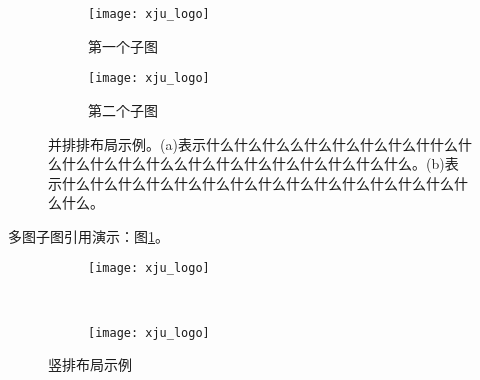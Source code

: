 \begin{figure}[!htb]
	\centering
	\begin{subfigure}[t]{0.24\linewidth}
		\captionsetup{justification=centering} %
		\begin{minipage}[b]{1\linewidth}
			\texttt{[image: xju\_logo]}
			\caption{第一个子图}
			\label{xju_logo1:subfig1}
		\end{minipage}
	\end{subfigure}
	\begin{subfigure}[t]{0.24\linewidth}
		\captionsetup{justification=centering} %
		\begin{minipage}[b]{1\linewidth}
			\texttt{[image: xju\_logo]}
			\caption{第二个子图}
			\label{xju_logo1:subfig2}
		\end{minipage}
	\end{subfigure}
	\caption{并排排布局示例。(a)表示什么什么什么么什么什么什么什么什什么什么什么什么什么什么么什么什么什么什么什么什么什么什么。(b)表示什么什么什么什么什么什么什么什么什么什么什么什么什么什么什么什么。}
	\label{xju_logo1}
\end{figure}

多图子图引用演示：图\ref{xju_logo1:subfig1}。

\begin{figure}[!htb]
	\centering
	\begin{subfigure}[t]{0.15\linewidth}
		\captionsetup{justification=centering}
		\begin{minipage}[b]{1\linewidth}
			\texttt{[image: xju\_logo]}
			\caption{}
		\end{minipage}
	\end{subfigure}\\
	\begin{subfigure}[t]{0.15\linewidth}
		\captionsetup{justification=centering}
		\begin{minipage}[b]{1\linewidth}
			\texttt{[image: xju\_logo]}
			\caption{}
		\end{minipage}
	\end{subfigure}
	\caption{竖排布局示例}
	\label{xju_logo2}
\end{figure}


